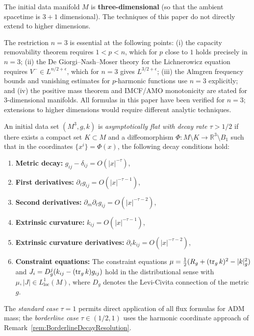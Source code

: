 \begin{assumption}[Dimension]\label{ass:dimension}
The initial data manifold $M$ is \textbf{three-dimensional} (so that the ambient spacetime is $3+1$ dimensional). The techniques of this paper do not directly extend to higher dimensions.
\end{assumption}

\begin{remark}\label{rem:DimensionVerification}
The restriction $n = 3$ is essential at the following points: (i) the capacity removability theorem requires $1 < p < n$, which for $p$ close to $1$ holds precisely in $n = 3$; (ii) the De Giorgi--Nash--Moser theory for the Lichnerowicz equation requires $V^- \in L^{n/2+\epsilon}$, which for $n = 3$ gives $L^{3/2+\epsilon}$; (iii) the Almgren frequency bounds and vanishing estimates for $p$-harmonic functions use $n = 3$ explicitly; and (iv) the positive mass theorem and IMCF/AMO monotonicity are stated for $3$-dimensional manifolds. All formulas in this paper have been verified for $n = 3$; extensions to higher dimensions would require different analytic techniques.
\end{remark}

\begin{definition}\label{def:GlobalAF}
An initial data set $(M^3, g, k)$ is \emph{asymptotically flat with decay rate $\tau > 1/2$} if there exists a compact set $K \subset M$ and a diffeomorphism $\Phi: M \setminus K \to \mathbb{R}^3 \setminus B_1$ such that in the coordinates $\{x^i\} = \Phi(x)$, the following decay conditions hold:
\begin{enumerate}[(AF1)]
    \item \textbf{Metric decay:} $g_{ij} - \delta_{ij} = O(|x|^{-\tau})$,
    \item \textbf{First derivatives:} $\partial_\ell g_{ij} = O(|x|^{-\tau-1})$,
    \item \textbf{Second derivatives:} $\partial_m \partial_\ell g_{ij} = O(|x|^{-\tau-2})$,
    \item \textbf{Extrinsic curvature:} $k_{ij} = O(|x|^{-\tau-1})$,
    \item \textbf{Extrinsic curvature derivatives:} $\partial_\ell k_{ij} = O(|x|^{-\tau-2})$,
    \item \textbf{Constraint equations:} The constraint equations $\mu = \frac{1}{2}(R_g + (\operatorname{tr}_g k)^2 - |k|_g^2)$ and $J_i = D^j_g(k_{ij} - (\operatorname{tr}_g k)g_{ij})$ hold in the distributional sense with $\mu, |J| \in L^1_{\mathrm{loc}}(M)$, where $D_g$ denotes the Levi-Civita connection of the metric $g$.
\end{enumerate}
The \emph{standard case} $\tau = 1$ permits direct application of all flux formulas for ADM mass; the \emph{borderline case} $\tau \in (1/2, 1)$ uses the harmonic coordinate approach of Remark~\ref{rem:BorderlineDecayResolution}.
\end{definition}

